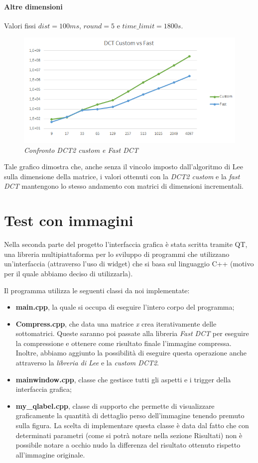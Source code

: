 \documentclass[a4paper,12pt]{report}
\newcommand{\mychapter}[2]{
    \setcounter{chapter}{#1}
    \setcounter{section}{0}
    \chapter*{#2}
    \addcontentsline{toc}{chapter}{#2}
}
\begin{document}
\subsubsection*{Altre dimensioni}
Valori fissi \(dist=100ms\), \(round=5\) e \(time\_limit=1800s\).
\begin{figure}[H]
\centering
\includegraphics[width=0.77\linewidth]{../img/customvsfast.png}
\caption{\textit{Confronto DCT2 custom e Fast DCT}}
\end{figure}

\noindent Tale grafico dimostra che, anche senza il vincolo imposto dall'algoritmo di Lee sulla dimensione della matrice, i valori ottenuti con la \textit{DCT2 custom} e la \textit{fast DCT} mantengono lo stesso andamento con matrici di dimensioni incrementali. 


\mychapter{2}{Test con immagini}
Nella seconda parte del progetto l'interfaccia grafica è stata scritta tramite QT, una libreria multipiattaforma per lo sviluppo di programmi che utilizzano un'interfaccia (attraverso l'uso di widget) che si basa sul linguaggio C++ (motivo per il quale abbiamo deciso di utilizzarla).
\bigskip

\noindent Il programma utilizza le seguenti classi da noi implementate:
\begin{itemize}
\item \textbf{main.cpp}, la quale si occupa di eseguire l'intero corpo del programma;
\item \textbf{Compress.cpp}, che data una matrice \textit{x} crea iterativamente delle sottomatrici. Queste saranno poi passate alla libreria \textit{Fast DCT} per eseguire la compressione e ottenere come risultato finale l'immagine compressa. Inoltre, abbiamo aggiunto la possibilità di eseguire questa operazione anche attraverso la \textit{libreria di Lee} e la \textit{custom DCT2}.
\item \textbf{mainwindow.cpp}, classe che gestisce tutti gli aspetti e i trigger della interfaccia grafica;
\item \textbf{my\_qlabel.cpp}, classe di supporto che permette di visualizzare graficamente la quantità di dettaglio perso dell'immagine tenendo premuto sulla figura. La scelta di implementare questa classe è data dal fatto che con determinati parametri (come si potrà notare nella sezione Risultati) non è possibile notare a occhio nudo la differenza del risultato ottenuto rispetto all'immagine originale.
\end{itemize}
\end{document}
